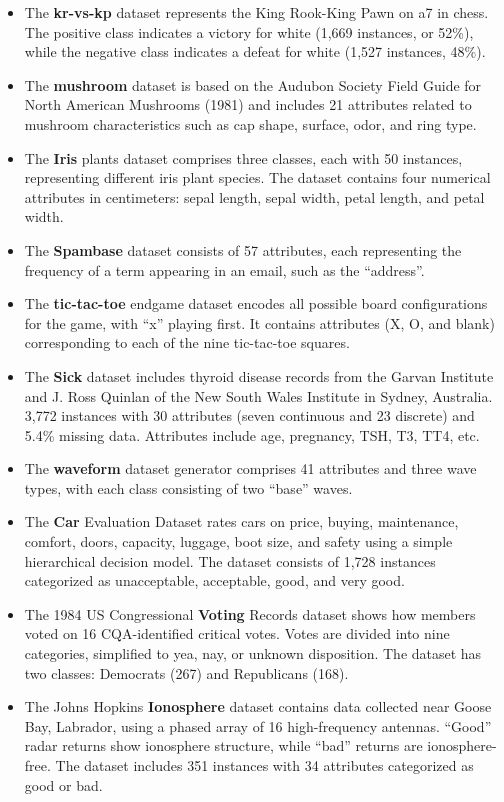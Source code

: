 \documentclass[default]{bst/sn-jnl_mine}%
\begin{document}
\begin{itemize}
    \item The \textbf{kr-vs-kp} dataset represents the King Rook-King Pawn on a7 in chess. The positive class indicates a victory for white (1,669 instances, or 52\%), while the negative class indicates a defeat for white (1,527 instances, 48\%).
    \item The \textbf{mushroom} dataset is based on the Audubon Society Field Guide for North American Mushrooms (1981) and includes 21 attributes related to mushroom characteristics such as cap shape, surface, odor, and ring type.
    \item The \textbf{Iris} plants dataset comprises three classes, each with 50 instances, representing different iris plant species. The dataset contains four numerical attributes in centimeters: sepal length, sepal width, petal length, and petal width.
    \item The \textbf{Spambase} dataset consists of 57 attributes, each representing the frequency of a term appearing in an email, such as the ``address''.
    \item The \textbf{tic-tac-toe} endgame dataset encodes all possible board configurations for the game, with ``x'' playing first. It contains attributes (X, O, and blank) corresponding to each of the nine tic-tac-toe squares.
    \item The \textbf{Sick} dataset includes thyroid disease records from the Garvan Institute and J. Ross Quinlan of the New South Wales Institute in Sydney, Australia. 3,772 instances with 30 attributes (seven continuous and 23 discrete) and 5.4\% missing data. Attributes include age, pregnancy, TSH, T3, TT4, etc.
    \item The \textbf{waveform} dataset generator comprises 41 attributes and three wave types, with each class consisting of two ``base'' waves.
    \item The \textbf{Car} Evaluation Dataset rates cars on price, buying, maintenance, comfort, doors, capacity, luggage, boot size, and safety using a simple hierarchical decision model. The dataset consists of 1,728 instances categorized as unacceptable, acceptable, good, and very good.
    \item The 1984 US Congressional \textbf{Voting} Records dataset shows how members voted on 16 CQA-identified critical votes. Votes are divided into nine categories, simplified to yea, nay, or unknown disposition. The dataset has two classes: Democrats (267) and Republicans (168).
    \item The Johns Hopkins \textbf{Ionosphere} dataset contains data collected near Goose Bay, Labrador, using a phased array of 16 high-frequency antennas. ``Good'' radar returns show ionosphere structure, while ``bad'' returns are ionosphere-free. The dataset includes 351 instances with 34 attributes categorized as good or bad.
\end{itemize}
\end{document}
